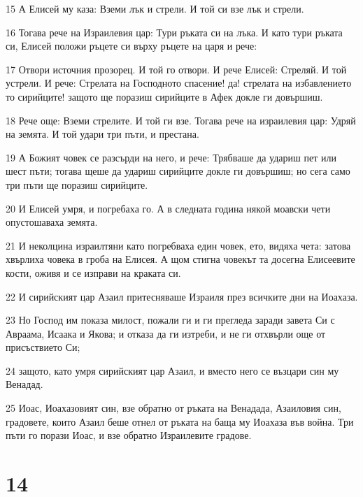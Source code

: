 \par 15 А Елисей му каза: Вземи лък и стрели. И той си взе лък и стрели.
\par 16 Тогава рече на Израилевия цар: Тури ръката си на лъка. И като тури ръката си, Елисей положи ръцете си върху ръцете на царя и рече:
\par 17 Отвори источния прозорец. И той го отвори. И рече Елисей: Стреляй. И той устрели. И рече: Стрелата на Господното спасение! да! стрелата на избавлението то сирийците! защото ще поразиш сирийците в Афек докле ги довършиш.
\par 18 Рече още: Вземи стрелите. И той ги взе. Тогава рече на израилевия цар: Удряй на земята. И той удари три пъти, и престана.
\par 19 А Божият човек се разсърди на него, и рече: Трябваше да удариш пет или шест пъти; тогава щеше да удариш сирийците докле ги довършиш; но сега само три пъти ще поразиш сирийците.
\par 20 И Елисей умря, и погребаха го. А в следната година някой моавски чети опустошаваха земята.
\par 21 И неколцина израилтяни като погребваха един човек, ето, видяха чета: затова хвърлиха човека в гроба на Елисея. А щом стигна човекът та досегна Елисеевите кости, оживя и се изправи на краката си.
\par 22 И сирийският цар Азаил притесняваше Израиля през всичките дни на Иоахаза.
\par 23 Но Господ им показа милост, пожали ги и ги прегледа заради завета Си с Авраама, Исаака и Якова; и отказа да ги изтреби, и не ги отхвърли още от присъствието Си;
\par 24 защото, като умря сирийският цар Азаил, и вместо него се възцари син му Венадад.
\par 25 Иоас, Иоахазовият син, взе обратно от ръката на Венадада, Азаиловия син, градовете, които Азаил беше отнел от ръката на баща му Иоахаза във война. Три пъти го порази Иоас, и взе обратно Израилевите градове.

\chapter{14}

